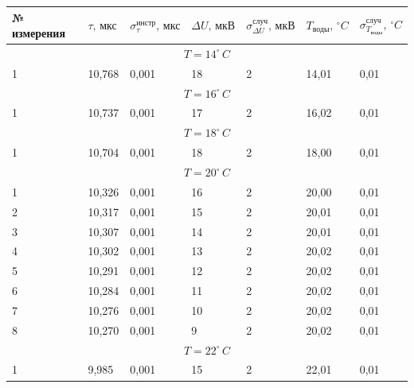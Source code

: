 \documentclass[10pt,a4paper]{article}
\begin{document}
	\begin{longtable}[h!]{|l|l|l|l|l|l|l|}
\hline
№ измерения &
  $\tau,\, \text{мкс}$ &
  $\sigma_{\tau}^{\text{инстр}},\, \text{мкс}$ &
  $\Delta U, \, \text{мкВ}$ &
  $\sigma_{\Delta U}^{\text{случ}}, \,   \text{мкВ}$ &
  $T_{\text{воды}},\, ^{\circ}C$ &
  $\sigma_{T_{\text{воды}}}^{\text{случ}},\,   ^{\circ}C$ \\ \hline
\multicolumn{7}{|c|}{$T = 14^{\circ}\,C$}                                            \\ \hline
1 & 10,768 & 0,001 & 18 & 2                      & 14,01 & 0,01                      \\ \hline
\multicolumn{7}{|c|}{$T = 16^{\circ}\,C$}                                            \\ \hline
1 & 10,737 & 0,001 & 17 & 2                      & 16,02 & 0,01                      \\ \hline
\multicolumn{7}{|c|}{$T = 18^{\circ}\,C$}                                            \\ \hline
1 & 10,704 & 0,001 & 18 & 2                      & 18,00 & 0,01                      \\ \hline
\multicolumn{7}{|c|}{$T = 20^{\circ}\,C$}                                            \\ \hline
1 & 10,326 & 0,001 & 16 & 2                      & 20,00 & 0,01                      \\ \hline
2 & 10,317 & 0,001 & 15 & 2                      & 20,01 & 0,01                      \\ \hline
3 & 10,307 & 0,001 & 14 & 2                      & 20,01 & 0,01                      \\ \hline
4 & 10,302 & 0,001 & 13 & 2                      & 20,02 & 0,01                      \\ \hline
5 & 10,291 & 0,001 & 12 & 2                      & 20,02 & 0,01                      \\ \hline
6 & 10,284 & 0,001 & 11 & 2                      & 20,02 & 0,01                      \\ \hline
7 & 10,276 & 0,001 & 10 & 2                      & 20,02 & 0,01                      \\ \hline
8 & 10,270 & 0,001 & 9  & 2                      & 20,02 & 0,01                      \\ \hline
\multicolumn{7}{|c|}{$T = 22^{\circ}\,C$}                                            \\ \hline
1 & 9,985  & 0,001 & 15 & 2                      & 22,01 & 0,01                      \\ \hline

\end{longtable}
\end{document}
